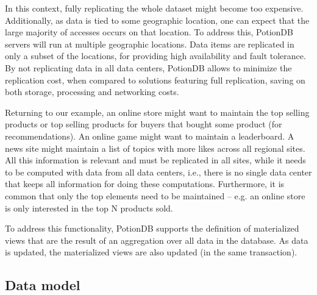 \documentclass[sigplan,10pt]{acmart}
\begin{document}
In this context, fully replicating the whole dataset might become too expensive.
Additionally, as data is tied to some geographic location, one can expect that the large majority of accesses
occurs on that location. 
To address this, PotionDB servers will run at multiple geographic locations.
Data items are replicated in only a subset of the locations, for providing high availability and fault tolerance.
By not replicating data in all data centers, PotionDB allows to minimize the replication cost, when
compared to solutions featuring full replication, saving on both storage, processing and networking costs.

Returning to our example, an online store might want to maintain the top selling products or top selling products
for buyers that bought some product (for recommendations).
An online game might want to maintain a leaderboard. 
A news site might maintain a list of topics with more likes across all regional sites.
All this information is relevant and must be replicated in all sites, while it needs to be computed with 
data from all data centers, i.e., there is no single data center that keeps all information for doing
these computations. 
Furthermore, it is common that only the top elements need to be maintained -- e.g. an online store
is only interested in the top N products sold.

To address this functionality, PotionDB supports the definition of materialized views that 
are the result of an aggregation over all data in the database. As data is updated, the materialized 
views are also updated (in the same transaction). 


\subsection{Data model}
\label{subsec:datamodel}
\end{document}
